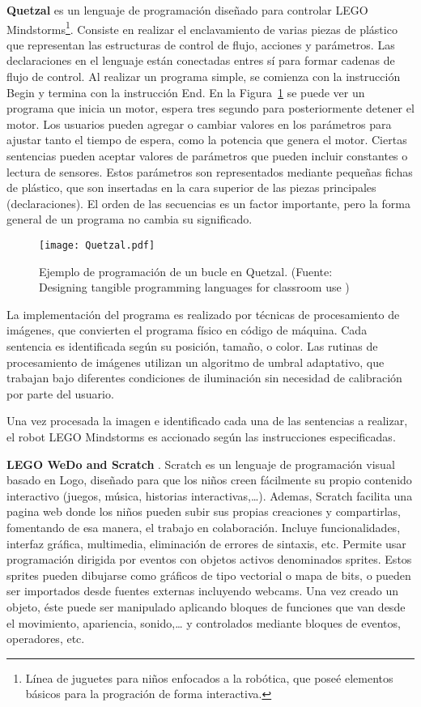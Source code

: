 \textbf{Quetzal} \cite{Quetzal} es un lenguaje de programación diseñado para controlar LEGO Mindstorms\footnote{Línea de juguetes para niños enfocados a la robótica, que poseé elementos básicos para la progración de forma interactiva.}. Consiste en realizar el enclavamiento de varias piezas de plástico que representan las estructuras de control de flujo, acciones y parámetros. Las declaraciones en el lenguaje están conectadas entres sí para formar cadenas de flujo de control.
Al realizar un programa simple, se comienza con la instrucción Begin y termina con la instrucción End. En la Figura~\ref{fig:Quetzal} se puede ver un programa que inicia un motor, espera tres segundo para posteriormente detener el motor. Los usuarios pueden agregar o cambiar valores en los parámetros para ajustar tanto el tiempo de espera, como la potencia que genera el motor. Ciertas sentencias pueden aceptar valores de parámetros que pueden incluir constantes o lectura de sensores. Estos parámetros son representados mediante pequeñas fichas de plástico, que son insertadas en la cara superior de las piezas principales (declaraciones). El orden de las secuencias es un factor importante, pero la forma general de un programa no cambia su significado.

\begin{figure}[!h]
\begin{center}
\texttt{[image: Quetzal.pdf]}
\caption{Ejemplo de programación de un bucle en Quetzal. (Fuente: Designing tangible programming languages for classroom use \cite{Quetzal})}
\label{fig:Quetzal}
\end{center}
\end{figure}

La implementación del programa es realizado por técnicas de procesamiento de imágenes, que convierten el programa físico en código de máquina. Cada sentencia es identificada según su posición, tamaño, o color. Las rutinas de procesamiento de imágenes utilizan un algoritmo de umbral adaptativo, que trabajan bajo diferentes condiciones de iluminación sin necesidad de calibración por parte del usuario. 

Una vez procesada la imagen e identificado cada una de las sentencias a realizar, el robot LEGO Mindstorms es accionado según las instrucciones especificadas.

\textbf{LEGO WeDo and Scratch} \cite{ScratchWeDo}. Scratch \cite{Scratch} es un lenguaje de programación visual basado en Logo, diseñado para que los niños creen fácilmente su propio contenido interactivo (juegos, música, historias interactivas,…). Ademas, Scratch facilita una pagina web donde los niños pueden subir sus propias creaciones y compartirlas, fomentando de esa manera, el trabajo en colaboración. Incluye funcionalidades, interfaz gráfica, multimedia, eliminación de errores de sintaxis, etc. Permite usar programación dirigida por eventos con objetos activos denominados sprites. Estos sprites pueden dibujarse como gráficos de tipo vectorial o mapa de bits, o pueden ser importados desde fuentes externas incluyendo webcams. Una vez creado un objeto, éste puede ser manipulado aplicando bloques de funciones que van desde el movimiento, apariencia, sonido,… y controlados mediante bloques de eventos, operadores, etc.

